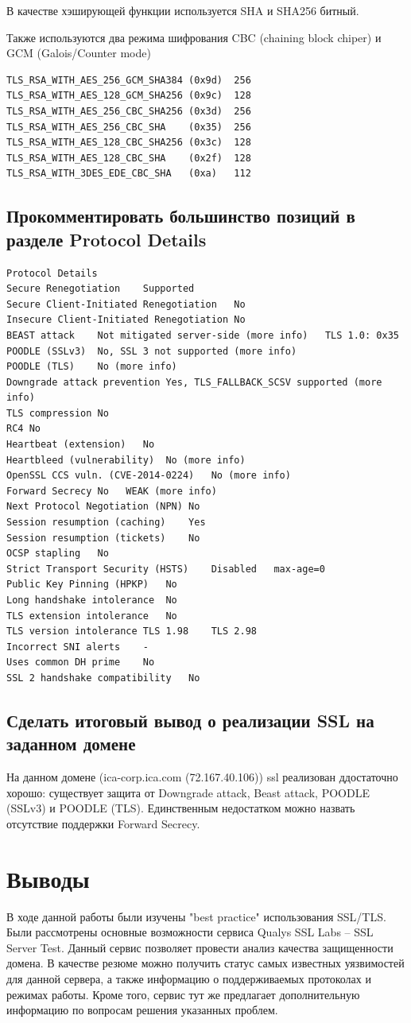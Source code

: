 \documentclass[10pt,a4paper]{article}
\begin{document}
В качестве хэширующей функции используется SHA и SHA256 битный.

Также используются два режима шифрования CBC  (chaining block chiper) и GCM (Galois/Counter mode)
\small
\begin{lstlisting}
TLS_RSA_WITH_AES_256_GCM_SHA384 (0x9d)	256
TLS_RSA_WITH_AES_128_GCM_SHA256 (0x9c)	128
TLS_RSA_WITH_AES_256_CBC_SHA256 (0x3d)	256
TLS_RSA_WITH_AES_256_CBC_SHA 	(0x35)	256
TLS_RSA_WITH_AES_128_CBC_SHA256 (0x3c)	128
TLS_RSA_WITH_AES_128_CBC_SHA 	(0x2f)	128
TLS_RSA_WITH_3DES_EDE_CBC_SHA 	(0xa)	112
\end{lstlisting}

\subsection{Прокомментировать большинство позиций в разделе Protocol Details}
\begin{verbatim}
Protocol Details
Secure Renegotiation	Supported
Secure Client-Initiated Renegotiation	No
Insecure Client-Initiated Renegotiation	No
BEAST attack	Not mitigated server-side (more info)   TLS 1.0: 0x35
POODLE (SSLv3)	No, SSL 3 not supported (more info)
POODLE (TLS)	No (more info)
Downgrade attack prevention	Yes, TLS_FALLBACK_SCSV supported (more info)
TLS compression	No
RC4	No
Heartbeat (extension)	No
Heartbleed (vulnerability)	No (more info)
OpenSSL CCS vuln. (CVE-2014-0224)	No (more info)
Forward Secrecy	No   WEAK (more info)
Next Protocol Negotiation (NPN)	No
Session resumption (caching)	Yes
Session resumption (tickets)	No
OCSP stapling	No
Strict Transport Security (HSTS)	Disabled   max-age=0
Public Key Pinning (HPKP)	No
Long handshake intolerance	No
TLS extension intolerance	No
TLS version intolerance	TLS 1.98 	TLS 2.98 
Incorrect SNI alerts	-
Uses common DH prime	No
SSL 2 handshake compatibility	No
\end{verbatim}

\subsection{Сделать итоговый вывод о реализации SSL на заданном домене}
На данном домене (ica-corp.ica.com (72.167.40.106)) ssl реализован ддостаточно хорошо: существует защита  от Downgrade attack, Beast attack, POODLE (SSLv3) и  POODLE (TLS). Единственным недостатком можно назвать отсутствие поддержки Forward Secrecy.

\section{Выводы}

В ходе данной работы были изучены "best practice" использования SSL/TLS. Были рассмотрены основные возможности сервиса Qualys SSL Labs – SSL Server Test. Данный сервис позволяет провести анализ качества защищенности домена. В качестве резюме можно получить статус самых известных уязвимостей для данной сервера, а также информацию о поддерживаемых протоколах и режимах работы. Кроме того, сервис тут же предлагает дополнительную информацию по вопросам решения указанных проблем. 
\end{document}
